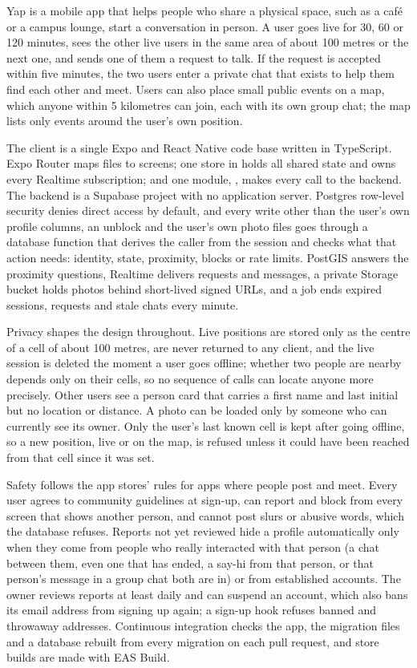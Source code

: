 Yap is a mobile app that helps people who share a physical space, such as a café or a campus lounge,
start a conversation in person. A user goes live for 30, 60 or 120 minutes, sees the other live users
in the same area of about 100 metres or the next one, and sends one of them a request to talk. If the request is accepted within five
minutes, the two users enter a private chat that exists to help them find each other and meet. Users can
also place small public events on a map, which anyone within 5 kilometres can join, each with its own
group chat; the map lists only events around the user's own position.

The client is a single Expo and React Native code base written in TypeScript. Expo Router maps files to
screens; one store in  holds all shared state and owns every Realtime
subscription; and one module, , makes every call to the backend. The backend is a
Supabase project with no application server. Postgres row-level security denies direct access by default,
and every write other than the user's own profile columns, an unblock and the user's own photo files
goes through a  database function that derives the caller from the session and
checks what that action needs: identity, state, proximity, blocks or rate limits. PostGIS answers the proximity
questions, Realtime delivers requests and messages, a private Storage bucket holds photos behind
short-lived signed URLs, and a  job ends expired sessions, requests and stale chats every
minute.

Privacy shapes the design throughout. Live positions are stored only as the centre of a cell of about
100 metres, are never returned to any client, and the live session is deleted the moment a user goes
offline; whether two
people are nearby depends only on their cells, so no sequence of calls can locate anyone more precisely. Other users see a person card that carries a
first name and last initial but no location or distance. A photo can be loaded only by someone who can
currently see its owner. Only the user's last known cell is kept after going offline, so a new position,
live or on the map, is refused unless it could have been reached from that cell since it was set.

Safety follows the app stores' rules for apps where people post and meet. Every user agrees to community
guidelines at sign-up, can report and block from every screen that shows another person, and cannot post
slurs or abusive words, which the database refuses. Reports not yet reviewed hide a profile
automatically only when they come from people who really interacted with that person (a chat between
them, even one that has ended, a say-hi from that person, or that person's message in a group chat both
are in) or from established accounts. The owner reviews
reports at least daily and can suspend an account, which also bans its email address from signing up
again; a sign-up hook refuses banned and throwaway addresses. Continuous integration checks the app, the migration files and a database rebuilt
from every migration on each pull request, and store builds are made with EAS Build.

